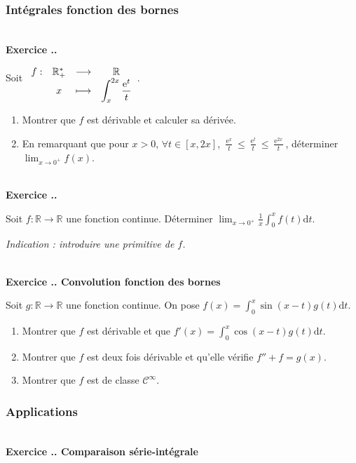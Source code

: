 \documentclass{article}
\newcommand{\fonction}[5]{\raisebox{-0.5\baselineskip}{$\begin{array}{lccc}
    #1: & #2 & \longrightarrow & #3 \\
        & #4 & \longmapsto & #5 \end{array}$}}
\newcommand{\di}{\mathrm{d}}
\newcommand{\ex}{{\operatorname{e}}}
\newcommand{\mb}[1]{\mathbb{#1}}
\newcommand{\mc}[1]{\mathcal{#1}}
\newcounter{exo}
\newcommand{\exercice}[1][\null]{\textbf{\\ Exercice \thesection.\theexo. #1} \addtocounter{exo}{1}}
\begin{document}
\subsubsection{Intégrales fonction des bornes}


\exercice

Soit $ \fonction{f}{\mb{R^*_+}}{\mb{R}}{x}{\displaystyle \int_x^{2x} \frac{\ex^t}{t}}$.

\begin{enumerate}

\item Montrer que $f$ est dérivable et calculer sa dérivée.

\item En remarquant que pour $x>0$, $\forall t \in [x,2x]$, $\displaystyle \frac{\ex^x}{t} \le \frac{\ex^t}{t} \le \frac{\ex^{2x}}{t} $, déterminer $\displaystyle \lim_{x \rightarrow 0^+} f(x)$.

\end{enumerate}

\exercice

Soit $f : \mb{R} \rightarrow \mb{R}$ une fonction continue. Déterminer $\displaystyle \lim_{x \rightarrow 0^+} \frac{1}{x} \int_0^x f(t) \di t$.

\emph{Indication : introduire une primitive de $f$.}



\exercice[Convolution fonction des bornes]

Soit $g : \mb{R} \rightarrow \mb{R}$ une fonction continue. On pose $f(x) = \displaystyle \int_0^x \sin(x-t) g(t) \di t$.

\begin{enumerate}

\item Montrer que $f$ est dérivable et que $f'(x) =  \displaystyle \int_0^x \cos(x-t) g(t) \di t$.

\item Montrer que $f$ est deux fois dérivable et qu'elle vérifie $f'' + f = g(x)$.

\item Montrer que $f$ est de classe $\mc{C}^\infty$.

\end{enumerate}


\subsubsection{Applications}

\exercice[Comparaison série-intégrale]
\end{document}
